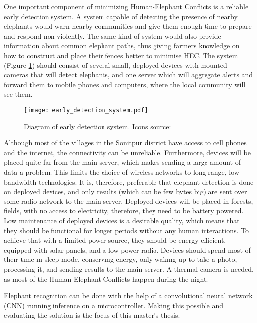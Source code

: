 One important component of minimizing Human-Elephant Conflicts is a reliable early detection system. 
A system capable of detecting the presence of nearby elephants would warn nearby communities and give them enough time to prepare and respond non-violently.
The same kind of system would also provide information about common elephant paths, thus giving farmers knowledge on how to construct and place their fences better to minimise HEC.
The system (Figure \ref{early_detection_system_diagram}) should consist of several small, deployed devices with mounted cameras that will detect elephants, and one server which will aggregate alerts and forward them to mobile phones and computers, where the local community will see them.

\begin{figure}[ht]
        \centering
        \texttt{[image: early\_detection\_system.pdf]} 
        \caption[Diagram of early detection system.]{Diagram of early detection system. Icons source:\cite{icons}}
        \label{early_detection_system_diagram}
\end{figure}

Although most of the villages in the Sonitpur district have access to cell phones and the internet, the connectivity can be unreliable\cite{wildlabs-elephants}. 
Furthermore, devices will be placed quite far from the main server, which makes sending a large amount of data a problem. 
This limits the choice of wireless networks to long range, low bandwidth technologies.
It is, therefore, preferable that elephant detection is done on deployed devices, and only results (which can be few bytes big) are sent over some radio network to the main server.
Deployed devices will be placed in forests, fields, with no access to electricity, therefore, they need to be battery powered.
Low maintenance of deployed devices is a desirable quality, which means that they should be functional for longer periods without any human interactions.
To achieve that with a limited power source, they should be energy efficient, equipped with solar panels, and a low power radio.
Devices should spend most of their time in sleep mode, conserving energy, only waking up to take a photo, processing it, and sending results to the main server.
A thermal camera is needed, as most of the Human-Elephant Conflicts happen during the night\cite{wildlabs-elephants}.

Elephant recognition can be done with the help of a convolutional neural network (CNN) running inference on a microcontroller. 
Making this possible and evaluating the solution is the focus of this master's thesis.


